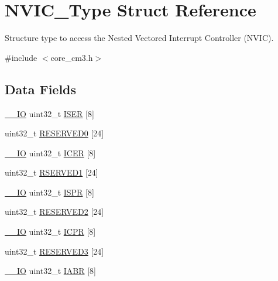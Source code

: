 \hypertarget{structNVIC__Type}{\section{N\-V\-I\-C\-\_\-\-Type Struct Reference}
\label{structNVIC__Type}
}


Structure type to access the Nested Vectored Interrupt Controller (N\-V\-I\-C).  




{\ttfamily \#include $<$core\-\_\-cm3.\-h$>$}

\subsection*{Data Fields}
\begin{DoxyCompactItemize}
\item 
\hyperlink{core__cm3_8h_aec43007d9998a0a0e01faede4133d6be}{\-\_\-\-\_\-\-I\-O} uint32\-\_\-t \hyperlink{structNVIC__Type_af90c80b7c2b48e248780b3781e0df80f}{I\-S\-E\-R} \mbox{[}8\mbox{]}
\item 
uint32\-\_\-t \hyperlink{structNVIC__Type_a2de17698945ea49abd58a2d45bdc9c80}{R\-E\-S\-E\-R\-V\-E\-D0} \mbox{[}24\mbox{]}
\item 
\hyperlink{core__cm3_8h_aec43007d9998a0a0e01faede4133d6be}{\-\_\-\-\_\-\-I\-O} uint32\-\_\-t \hyperlink{structNVIC__Type_a1965a2e68b61d2e2009621f6949211a5}{I\-C\-E\-R} \mbox{[}8\mbox{]}
\item 
uint32\-\_\-t \hyperlink{structNVIC__Type_a6d1daf7ab6f2ba83f57ff67ae6f571fe}{R\-S\-E\-R\-V\-E\-D1} \mbox{[}24\mbox{]}
\item 
\hyperlink{core__cm3_8h_aec43007d9998a0a0e01faede4133d6be}{\-\_\-\-\_\-\-I\-O} uint32\-\_\-t \hyperlink{structNVIC__Type_acf8e38fc2e97316242ddeb7ea959ab90}{I\-S\-P\-R} \mbox{[}8\mbox{]}
\item 
uint32\-\_\-t \hyperlink{structNVIC__Type_a0953af43af8ec7fd5869a1d826ce5b72}{R\-E\-S\-E\-R\-V\-E\-D2} \mbox{[}24\mbox{]}
\item 
\hyperlink{core__cm3_8h_aec43007d9998a0a0e01faede4133d6be}{\-\_\-\-\_\-\-I\-O} uint32\-\_\-t \hyperlink{structNVIC__Type_a46241be64208436d35c9a4f8552575c5}{I\-C\-P\-R} \mbox{[}8\mbox{]}
\item 
uint32\-\_\-t \hyperlink{structNVIC__Type_a9dd330835dbf21471e7b5be8692d77ab}{R\-E\-S\-E\-R\-V\-E\-D3} \mbox{[}24\mbox{]}
\item 
\hyperlink{core__cm3_8h_aec43007d9998a0a0e01faede4133d6be}{\-\_\-\-\_\-\-I\-O} uint32\-\_\-t \hyperlink{structNVIC__Type_a33e917b381e08dabe4aa5eb2881a7c11}{I\-A\-B\-R} \mbox{[}8\mbox{]}

\end{DoxyCompactItemize}
